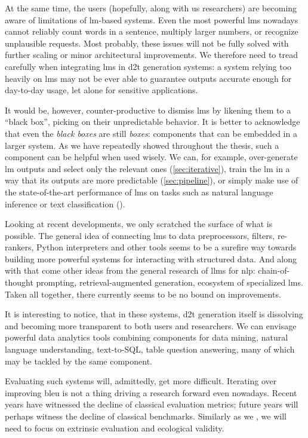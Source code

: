 At the same time, the users (hopefully, along with us researchers) are becoming aware of limitations of \ac{lm}-based systems. Even the most powerful \acp{lm} nowadays cannot reliably count words in a sentence, multiply larger numbers, or recognize unplausible requests. Most probably, these issues will not be fully solved with further scaling or minor architectural improvements. We therefore need to tread carefully when integrating \acp{lm} in \ac{d2t} generation systems: a system relying too heavily on \acp{lm} may not be ever able to guarantee outputs accurate enough for day-to-day usage, let alone for sensitive applications.

It would be, however, counter-productive to dismiss \acp{lm} by likening them to a ``black box'', picking on their unpredictable behavior. It is better to acknowledge that even the \emph{black boxes} are still \emph{boxes}: components that can be embedded in a larger system. As we have repeatedly showed throughout the thesis, such a component can be helpful when used wisely. We can, for example, over-generate \ac{lm} outputs and select only the relevant ones (\autoref{sec:iterative}), train the \ac{lm} in a way that its outputs are more predictable (\autoref{sec:pipeline}), or simply make use of the state-of-the-art performance of \acp{lm} on tasks such as natural language inference or text classification ().

Looking at recent developments, we only scratched the surface of what is possible. The general idea of connecting \acp{lm} to data preprocessors, filters, re-rankers, Python interpreters and other tools seems to be a surefire way towards building more powerful systems for interacting with structured data. And along with that come other ideas from the general research of \acp{llm} for \ac{nlp}: chain-of-thought prompting, retrieval-augmented generation, ecosystem of specialized \acp{lm}. Taken all together, there currently seems to be no bound on improvements.

It is interesting to notice, that in these systems, \ac{d2t} generation itself is dissolving and becoming more transparent to both users and researchers. We can envisage powerful data analytics tools combining components for data mining, natural language understanding, text-to-SQL, table question answering, many of which may be tackled by the same component.

Evaluating such systems will, admittedly, get more difficult. Iterating over improving \acs{bleu} is not a thing driving a research forward even nowadays. Recent years have witnessed the decline of classical evaluation metrics; future years will perhaps witness the decline of classical benchmarks. Similarly as we , we will need to focus on extrinsic evaluation and ecological validity.
